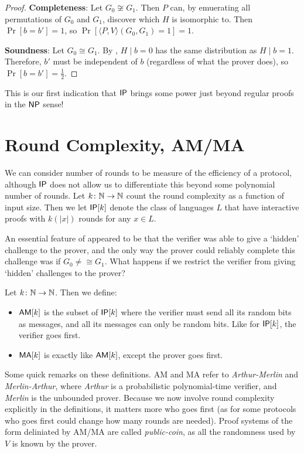 \documentclass{article}
\begin{document}
\begin{proof}
\textbf{Completeness}: Let $G_0 \not\cong G_1$.
Then $P$ can, by emuerating all permutations of $G_0$ and $G_1$, discover which $H$ is isomorphic to. Then $\Pr[b = b'] = 1$, so $\Pr[\langle P, V \rangle(G_0, G_1) = 1] = 1$.

\textbf{Soundness}: Let $G_0 \cong G_1$. 
By , $H \mid b = 0$ has the same distribution as $H \mid b = 1$. Therefore, $b'$ must be independent of $b$ (regardless of what the prover does), so $\Pr[b = b'] = \frac12$.

\end{proof}

This is our first indication that $\mathsf{IP}$ brings some power just beyond regular proofs in the $\mathsf{NP}$ sense!

\section{Round Complexity, AM/MA}

We can consider number of rounds to be measure of the efficiency of a protocol, although $\mathsf{IP}$ does not allow us to differentiate this beyond some polynomial number of rounds. Let $k \colon \mathbb{N} \to \mathbb{N}$ count the round complexity as a function of input size. 
Then we let $\mathsf{IP}[k]$ denote the class of languages $L$ that have interactive proofs with $k(|x|)$ rounds for any $x \in L$.

An essential feature of  appeared to be that the verifier was able to give a `hidden' challenge to the prover, and the only way the prover could reliably complete this challenge was if $G_0 \neq\cong G_1$.
What happens if we restrict the verifier from giving `hidden' challenges to the prover?

\begin{definition}
Let $k \colon \mathbb{N} \to \mathbb{N}$. Then we define:
\begin{itemize}
    \item $\mathsf{AM}[k]$ is the subset of $\mathsf{IP}[k]$ where the verifier must send all its random bits as messages, and all its messages can only be random bits. Like for $\mathsf{IP}[k]$, the verifier goes first.
    \item $\mathsf{MA}[k]$ is exactly like $\mathsf{AM}[k]$, except the prover goes first.
\end{itemize} 
\end{definition}

Some quick remarks on these definitions. AM and MA refer to \textit{Arthur-Merlin} and \textit{Merlin-Arthur}, where \textit{Arthur} is a probabilistic polynomial-time verifier, and \textit{Merlin} is the unbounded prover. 
Because we now involve round complexity explicitly in the definitions, it matters more who goes first (as for some protocols who goes first could change how many rounds are needed). Proof systems of the form deliniated by AM/MA are called \textit{public-coin}, as all the randomness used by $V$ is known by the prover.
\end{document}
